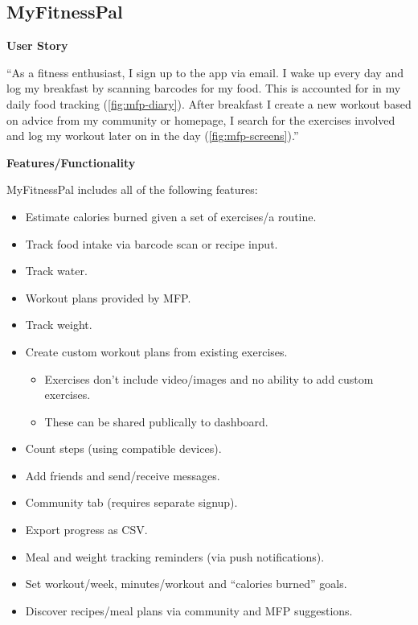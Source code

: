\subsection{MyFitnessPal}

\textbf{User Story}
\label{research-breakdown:mfp-usr-story}
\par
``As a fitness enthusiast, I sign up to the app via email. I wake up
every day and log my breakfast by scanning barcodes for my food.
This is accounted for in my daily food tracking (\cref{fig:mfp-diary}).
After breakfast I create a new workout based on advice from my community or homepage,
I search for the exercises involved and log my workout later on in the day (\cref{fig:mfp-screens}).''

\textbf{Features/Functionality}
\label{research-breakdown:mfp-features}
\par
MyFitnessPal includes all of the following features:
\begin{multicols}{2}
	\begin{itemize}[noitemsep]
		\item Estimate calories burned given a set of exercises/a routine.
		\item Track food intake via barcode scan or recipe input.
		\item Track water.
		\item Workout plans provided by MFP.
		\item Track weight.
		      \columnbreak
		\item Create custom workout plans from existing exercises.
		      \begin{itemize}[noitemsep]
			      \item Exercises don't include video/images and no ability to add custom exercises.
			      \item These can be shared publically to dashboard.
		      \end{itemize}
		\item Count steps (using compatible devices).
		\item Add friends and send/receive messages.
		\item Community tab (requires separate signup).
		\item Export progress as CSV.
		\item Meal and weight tracking reminders (via push notifications).
		\item Set workout/week, minutes/workout and ``calories burned'' goals.
		\item Discover recipes/meal plans via community and MFP suggestions.
	\end{itemize}
\end{multicols}

